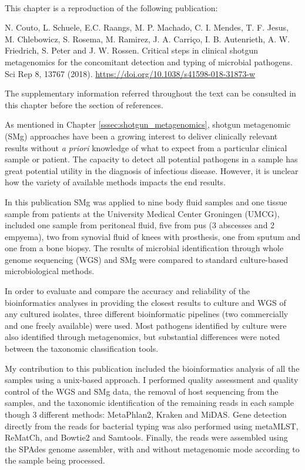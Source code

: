 \mbox{}\\
\vspace{8cm}

This chapter is a reproduction of the following publication:

N. Couto, L. Schuele, E.C. Raangs, M. P. Machado, C. I. Mendes, T. F. Jesus, M. Chlebowicz,  S. Rosema, M. Ramirez, J. A. Carriço, I. B. Autenrieth, A. W. Friedrich, S. Peter and J. W. Rossen. Critical steps in clinical shotgun metagenomics for the concomitant detection and typing of microbial pathogens. Sci Rep 8, 13767 (2018). \url{https://doi.org/10.1038/s41598-018-31873-w}

The supplementary information referred throughout the text can be consulted in
this chapter before the section of references. 

As mentioned in Chapter \ref{sssec:shotgun_metagenomics}, shotgun metagenomic (SMg) approaches have been a growing interest to deliver clinically relevant results without \textit{a priori} knowledge of what to expect from a particular clinical sample or patient. 
The capacity to detect all potential pathogens in a sample has great potential utility in the diagnosis of infectious disease. 
However, it is unclear how the variety of available methods impacts the end results.

In this publication SMg was applied to nine body fluid samples and one tissue sample from patients at the University Medical Center Groningen (UMCG), included one sample from peritoneal fluid, five from pus (3 abscesses and 2 empyema), two from synovial fluid of knees with prosthesis, one from sputum and one from a bone biopsy. The results of microbial identification through whole genome sequencing (WGS) and SMg were compared to standard culture-based microbiological methods. 

In order to evaluate and compare the accuracy and reliability of the bioinformatics analyses in providing the closest results to culture and WGS of any cultured isolates, three different bioinformatic pipelines (two commercially and one freely available) were used. Most pathogens identified by culture were also identified through metagenomics, but substantial differences were noted between the taxonomic classification tools. 

My contribution to this publication included the bioinformatics analysis of all the samples using a unix-based approach. I performed quality assessment and quality control of the WGS and SMg data, the removal of host sequencing from the samples, and the taxonomic identification of the remaining reads in each sample though 3 different methods: MetaPhlan2, Kraken and MiDAS. Gene detection directly from the reads for bacterial typing was also performed using metaMLST, ReMatCh, and Bowtie2 and Samtools. Finally, the reads were assembled using the SPAdes genome assembler, with and without metagenomic mode according to the sample being processed. 


